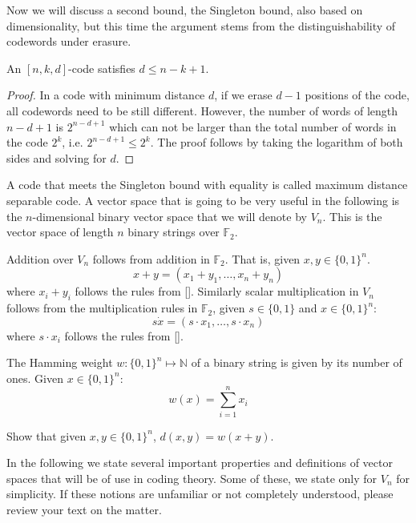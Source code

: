 Now we will discuss a second bound, the Singleton bound, also based on dimensionality, but this time the argument stems from the distinguishability of codewords under erasure.
\begin{theorem}
An $[n,k,d]$-code satisfies $d\leq n-k+1$.
\end{theorem}
\begin{proof}
In a code with minimum distance $d$, if we erase $d-1$ positions of the code, all codewords need to be still different. However, the number of words of length $n-d+1$ is $2^{n-d+1}$ which can not be larger than the total number of words in the code $2^k$, i.e. $2^{n-d+1}\leq2^k$. The proof follows by taking the logarithm of both sides and solving for $d$.
\end{proof}
A code that meets the Singleton bound with equality is called maximum distance separable code.
A vector space that is going to be very useful in the following is the $n$-dimensional binary vector space that we will denote by $V_n$. This is the vector space of length $n$ binary strings over $\mathbb F_2$. 

Addition over $V_n$ follows from addition in $\mathbb F_2$. That is, given $x,y\in\{0,1\}^n$.
\begin{equation}
x+y=(x_1+y_1,\ldots,x_n+y_n)
\end{equation}
where $x_i+y_i$ follows the rules from \eqref{}. Similarly scalar multiplication in $V_n$ follows from the multiplication rules in $\mathbb F_2$, given $s\in\{0,1\}$ and $x\in\{0,1\}^n$:
\begin{equation}
s\dot x=(s\cdot x_1,\ldots,s\cdot x_n)
\end{equation}
where $s\cdot x_i$ follows the rules from \eqref{}.
\begin{definition}
The Hamming weight $w:\{0,1\}^n\mapsto\mathbb N$ of a binary string is given by its number of ones. Given $x\in\{0,1\}^n$:
\begin{equation}
w(x)=\sum_{i=1}^nx_i
\end{equation}
\end{definition}


\begin{exercise}
Show that given $x,y\in\{0,1\}^n$, $d(x,y)=w(x+y)$.
\end{exercise}
In the following we state several important properties and definitions of vector spaces that will be of use in coding theory. Some of these, we state only for $V_n$ for simplicity. If these notions are unfamiliar or not completely understood, please review your text on the matter.

